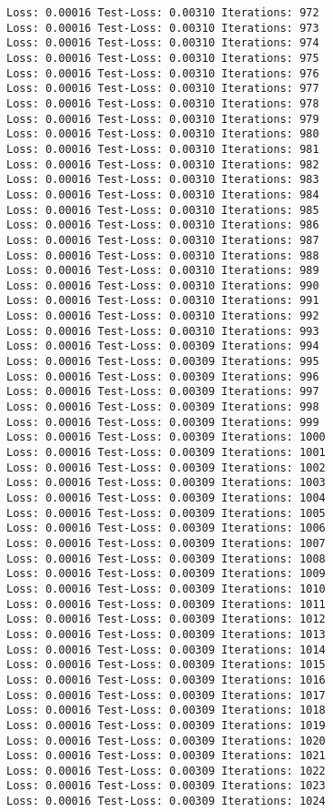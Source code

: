 \documentclass[11pt]{article}
\begin{document}
\begin{Verbatim}[commandchars=\\\{\}]
Loss: 0.00016 Test-Loss: 0.00310 Iterations: 972
Loss: 0.00016 Test-Loss: 0.00310 Iterations: 973
Loss: 0.00016 Test-Loss: 0.00310 Iterations: 974
Loss: 0.00016 Test-Loss: 0.00310 Iterations: 975
Loss: 0.00016 Test-Loss: 0.00310 Iterations: 976
Loss: 0.00016 Test-Loss: 0.00310 Iterations: 977
Loss: 0.00016 Test-Loss: 0.00310 Iterations: 978
Loss: 0.00016 Test-Loss: 0.00310 Iterations: 979
Loss: 0.00016 Test-Loss: 0.00310 Iterations: 980
Loss: 0.00016 Test-Loss: 0.00310 Iterations: 981
Loss: 0.00016 Test-Loss: 0.00310 Iterations: 982
Loss: 0.00016 Test-Loss: 0.00310 Iterations: 983
Loss: 0.00016 Test-Loss: 0.00310 Iterations: 984
Loss: 0.00016 Test-Loss: 0.00310 Iterations: 985
Loss: 0.00016 Test-Loss: 0.00310 Iterations: 986
Loss: 0.00016 Test-Loss: 0.00310 Iterations: 987
Loss: 0.00016 Test-Loss: 0.00310 Iterations: 988
Loss: 0.00016 Test-Loss: 0.00310 Iterations: 989
Loss: 0.00016 Test-Loss: 0.00310 Iterations: 990
Loss: 0.00016 Test-Loss: 0.00310 Iterations: 991
Loss: 0.00016 Test-Loss: 0.00310 Iterations: 992
Loss: 0.00016 Test-Loss: 0.00310 Iterations: 993
Loss: 0.00016 Test-Loss: 0.00309 Iterations: 994
Loss: 0.00016 Test-Loss: 0.00309 Iterations: 995
Loss: 0.00016 Test-Loss: 0.00309 Iterations: 996
Loss: 0.00016 Test-Loss: 0.00309 Iterations: 997
Loss: 0.00016 Test-Loss: 0.00309 Iterations: 998
Loss: 0.00016 Test-Loss: 0.00309 Iterations: 999
Loss: 0.00016 Test-Loss: 0.00309 Iterations: 1000
Loss: 0.00016 Test-Loss: 0.00309 Iterations: 1001
Loss: 0.00016 Test-Loss: 0.00309 Iterations: 1002
Loss: 0.00016 Test-Loss: 0.00309 Iterations: 1003
Loss: 0.00016 Test-Loss: 0.00309 Iterations: 1004
Loss: 0.00016 Test-Loss: 0.00309 Iterations: 1005
Loss: 0.00016 Test-Loss: 0.00309 Iterations: 1006
Loss: 0.00016 Test-Loss: 0.00309 Iterations: 1007
Loss: 0.00016 Test-Loss: 0.00309 Iterations: 1008
Loss: 0.00016 Test-Loss: 0.00309 Iterations: 1009
Loss: 0.00016 Test-Loss: 0.00309 Iterations: 1010
Loss: 0.00016 Test-Loss: 0.00309 Iterations: 1011
Loss: 0.00016 Test-Loss: 0.00309 Iterations: 1012
Loss: 0.00016 Test-Loss: 0.00309 Iterations: 1013
Loss: 0.00016 Test-Loss: 0.00309 Iterations: 1014
Loss: 0.00016 Test-Loss: 0.00309 Iterations: 1015
Loss: 0.00016 Test-Loss: 0.00309 Iterations: 1016
Loss: 0.00016 Test-Loss: 0.00309 Iterations: 1017
Loss: 0.00016 Test-Loss: 0.00309 Iterations: 1018
Loss: 0.00016 Test-Loss: 0.00309 Iterations: 1019
Loss: 0.00016 Test-Loss: 0.00309 Iterations: 1020
Loss: 0.00016 Test-Loss: 0.00309 Iterations: 1021
Loss: 0.00016 Test-Loss: 0.00309 Iterations: 1022
Loss: 0.00016 Test-Loss: 0.00309 Iterations: 1023
Loss: 0.00016 Test-Loss: 0.00309 Iterations: 1024

\end{Verbatim}
\end{document}
